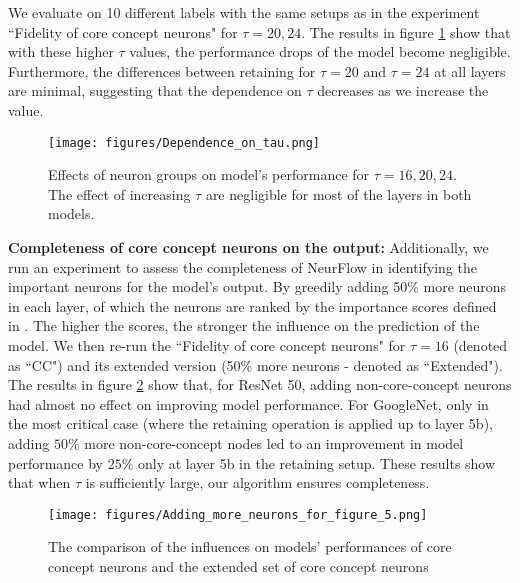 {We evaluate on 10 different labels with the same setups as in the experiment ``Fidelity of core concept neurons" for $\tau = 20, 24$. The results in figure \ref{fig:dependence on tau} show that with these higher $\tau$ values, the performance drops of the model become negligible. Furthermore, the differences between retaining for $\tau = 20$ and $\tau = 24$ at all layers are minimal, suggesting that the dependence on $\tau$ decreases as we increase the value.}

\begin{figure}[tb] 
\vspace{-3mm}
\begin{center}
\texttt{[image: figures/Dependence\_on\_tau.png]} 
\end{center}
\vspace{-3mm}
\caption{{Effects of neuron groups on model's performance for $\tau = 16, 20, 24$. The effect of increasing $\tau$ are negligible for most of the layers in both models.}}\label{fig:dependence on tau}
\end{figure}

{\textbf{Completeness of core concept neurons on the output:} Additionally, we run an experiment to assess the completeness of NeurFlow in identifying the important neurons for the model's output. By greedily adding 50\% more neurons in each layer, of which the neurons are ranked by the importance scores defined in \citet{neuronmct}. The higher the scores, the stronger the influence on the prediction of the model. We then re-run the ``Fidelity of core concept neurons" for $\tau = 16$ (denoted as ``CC") and its extended version (50\% more neurons - denoted as ``Extended"). The results in figure \ref{fig:completeness} show that, for ResNet 50, adding non-core-concept neurons had almost no effect on improving model performance. For GoogleNet, only in the most critical case (where the retaining operation is applied up to layer 5b), adding $50\%$ more non-core-concept nodes led to an improvement in model performance by $25\%$ only at layer 5b in the retaining setup. These results show that when $\tau$ is sufficiently large, our algorithm ensures completeness.}

\begin{figure}[tb] 
\vspace{-3mm}
\begin{center}
\texttt{[image: figures/Adding\_more\_neurons\_for\_figure\_5.png]} 
\end{center}
\vspace{-3mm}
\caption{{The comparison of the influences on models' performances of core concept neurons and the extended set of core concept neurons}}\label{fig:completeness}
\end{figure}

